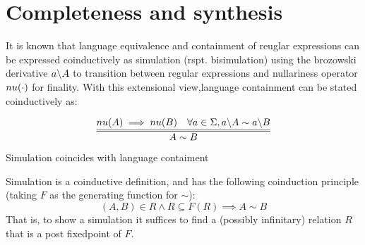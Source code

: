 \documentclass[a4paper,UKenglish,cleveref, autoref, thm-restate]{lipics-v2021}
\begin{document}
\section{Completeness and synthesis}
It is known that language equivalence and containment of reuglar expressions can be expressed coinductively as simulation (rspt. bisimulation) using the brozowski derivative $a \backslash A$ to transition between regular expressions and nullariness operator $\mynu{\cdot}$ for finality. With this extensional view,language containment can be stated coinductively as:
\begin{definition}[Simulation]
\[\infer={A \sim B}{\mynu{A} \implies \mynu{B} & \forall a \in \Sigma, \derive{a}{A} \sim \derive{a}{B} }\]
\end{definition}
\begin{lemma}
Simulation coincides with language contaiment
\end{lemma}
Simulation is a coinductive definition, and has the following coinduction principle (taking $F$ as the generating function for $\sim$):\\
\[ (A,B) \in R \land R \subseteq F(R) \implies A \sim B  \]
That is, to show a simulation it suffices to find a (possibly infinitary) relation $R$ that is a post fixedpoint of $F$. 

\end{document}

